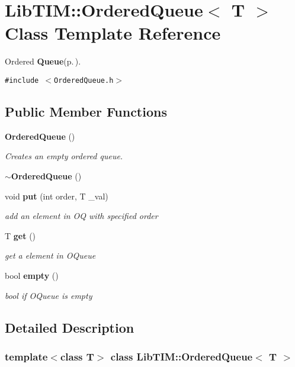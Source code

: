 \section{Lib\-TIM::Ordered\-Queue$<$ T $>$ Class Template Reference}
\label{classLibTIM_1_1OrderedQueue}
Ordered {\bf Queue}{\rm (p.\,\pageref{classLibTIM_1_1Queue})}.  


{\tt \#include $<$Ordered\-Queue.h$>$}

\subsection*{Public Member Functions}
\begin{CompactItemize}
\item 
{\bf Ordered\-Queue} ()
\begin{CompactList}\small\item\em Creates an empty ordered queue. \item\end{CompactList}\item 
{\bf $\sim$Ordered\-Queue} ()
\item 
void {\bf put} (int order, T \_\-val)
\begin{CompactList}\small\item\em add an element in OQ with specified order \item\end{CompactList}\item 
T {\bf get} ()
\begin{CompactList}\small\item\em get a element in OQueue \item\end{CompactList}\item 
bool {\bf empty} ()
\begin{CompactList}\small\item\em bool if OQueue is empty \item\end{CompactList}\end{CompactItemize}


\subsection{Detailed Description}
\subsubsection*{template$<$class T$>$ class Lib\-TIM::Ordered\-Queue$<$ T $>$}

